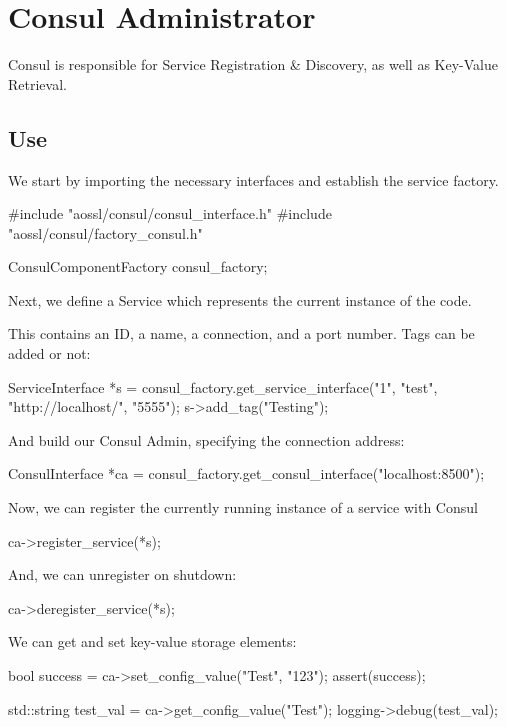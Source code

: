 \section*{Consul Administrator}

Consul is responsible for Service Registration \& Discovery, as well as Key-\/\+Value Retrieval.

\subsection*{Use}

We start by importing the necessary interfaces and establish the service factory. \begin{DoxyVerb}#include "aossl/consul/consul_interface.h"
#include "aossl/consul/factory_consul.h"

ConsulComponentFactory consul_factory;
\end{DoxyVerb}


Next, we define a Service which represents the current instance of the code.

This contains an ID, a name, a connection, and a port number. Tags can be added or not\+: \begin{DoxyVerb}ServiceInterface *s = consul_factory.get_service_interface("1", "test", "http://localhost/", "5555");
s->add_tag("Testing");
\end{DoxyVerb}


And build our Consul Admin, specifying the connection address\+: \begin{DoxyVerb}ConsulInterface *ca = consul_factory.get_consul_interface("localhost:8500");
\end{DoxyVerb}


Now, we can register the currently running instance of a service with Consul \begin{DoxyVerb}ca->register_service(*s);
\end{DoxyVerb}


And, we can unregister on shutdown\+: \begin{DoxyVerb}ca->deregister_service(*s);
\end{DoxyVerb}


We can get and set key-\/value storage elements\+: \begin{DoxyVerb}bool success = ca->set_config_value("Test", "123");
assert(success);

std::string test_val = ca->get_config_value("Test");
logging->debug(test_val);
\end{DoxyVerb}


